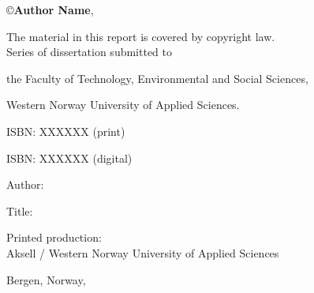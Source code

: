 \documentclass[12pt]{book} %
\title{
    {\fontsize{20}{24}{\color{Maroon}\spaceduppercaps{Thesis Title Goes Here }}}
	\author{
        \textbf{Doctoral Dissertation by}\\ 
        \textbf{Author Name}\vspace{0.5cm}\\
		Thesis submitted for\\ 
        the degree of Philosophiae Doctor (PhD)\\
        in\\ 
        Computer Science:\\
        {\fontsize{12}{14}Software Engineering, Sensor Networks and Engineering Computing}\vspace{0.5cm}\\
		\texttt{[image: logos/logo.pdf]}\vspace{0.5cm}\\
        Department of Computer Science,\\ 
		Electrical Engineering and Mathematical Sciences\vspace{0.3cm}\\
		Faculty of Technology, Environmental and Social Sciences \vspace{0.3cm}\\
		Western Norway University of Applied Sciences
	}
	\date{Month day, year}
}
\begin{document}
\newcommand{\TextSize}{13}
\newcommand{\BaseLineSkip}{15}
\fontsize{\TextSize}{\BaseLineSkip}
\selectfont

\cleardoublepage
\maketitle
\thispagestyle{empty}

\normalsize\vspace*{12cm}
\begin{minipage}{13cm}

\copyright{\textbf{Author Name}}, \textbf{ \the\year{}}\vspace{2ex}  %

The material in this report is covered by copyright law.\vspace{3ex}\\

Series of dissertation submitted to

the Faculty of Technology, Environmental and Social Sciences,

Western Norway University of Applied Sciences.\vspace{3ex}

ISBN: XXXXXX (print) %

ISBN: XXXXXX\vspace{3ex} (digital) %


Author: 

Title: \vspace{4ex}

Printed production: \\
Aksell / Western Norway University of Applied Sciences \vspace{3ex}

Bergen, Norway, \the\year{}
\end{minipage}

\ifDraftMargin
\fi
\end{document}
